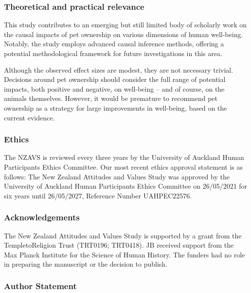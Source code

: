 \documentclass[
  singlecolumn,
  9pt]{article}
\begin{document}
\subsubsection{Theoretical and practical
relevance}\label{theoretical-and-practical-relevance}

This study contributes to an emerging but still limited body of
scholarly work on the causal impacts of pet ownership on various
dimensions of human well-being. Notably, the study employs advanced
causal inference methods, offering a potential methodological framework
for future investigations in this area.

Although the observed effect sizes are modest, they are not necessary
trivial. Decisions around pet ownership should consider the full range
of potential impacts, both positive and negative, on well-being -- and
of course, on the animals themselves. However, it would be premature to
recommend pet ownership as a strategy for large improvements in
well-being, based on the current evidence.

\newpage{}

\subsubsection{Ethics}\label{ethics}

The NZAVS is reviewed every three years by the University of Auckland
Human Participants Ethics Committee. Our most recent ethics approval
statement is as follows: The New Zealand Attitudes and Values Study was
approved by the University of Auckland Human Participants Ethics
Committee on 26/05/2021 for six years until 26/05/2027, Reference Number
UAHPEC22576.

\subsubsection{Acknowledgements}\label{acknowledgements}

The New Zealand Attitudes and Values Study is supported by a grant from
the TempletoReligion Trust (TRT0196; TRT0418). JB received support from
the Max Planck Institute for the Science of Human History. The funders
had no role in preparing the manuscript or the decision to publish.

\subsubsection{Author Statement}\label{author-statement}
\end{document}
